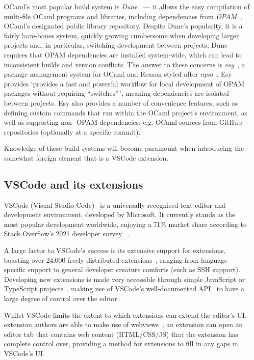 OCaml's most popular build system is \textit{Dune}~\cite{dune} --- it allows the
easy compilation of multi-file OCaml programs and libraries, including
dependencies from \textit{OPAM}~\cite{opam}, OCaml's designated public library
repository. Despite Dune's popularity, it is a fairly bare-bones system, quickly
growing cumbersome when developing larger projects and, in particular,
switching development between projects; Dune requires that OPAM dependencies
are installed system-wide, which can lead to inconsistent builds and version
conflicts. The answer to these concerns is \textit{esy}~\cite{esy}, a package
management system for OCaml and Reason styled after \textit{npm}~\cite{npm}.
Esy provides `provides a fast and powerful workflow for local development of
OPAM packages without requiring ``switches''\,', meaning dependencies are
isolated between projects. Esy also provides a number of convenience features,
such as defining custom commands that run within the OCaml project's
environment, as well as supporting non- OPAM dependencies, e.g. OCaml sources
from GitHub repositories (optionally at a specific commit).

Knowledge of these build systems will become paramount when introducing the
somewhat foreign element that is a VSCode extension.

\subsection{VSCode and its extensions}\label{sec:vscode}

VSCode (Visual Studio Code)~\cite{vscode} is a universally recognised text
editor and development environment, developed by Microsoft. It currently stands
as the most popular development worldwide, enjoying a 71\% market share
according to Stack Overflow's 2021 developer survey
~\cite{stack-overflow-survey-editors}.

A large factor to VSCode's success is its extensive support for extensions,
boasting over 24,000 freely-distributed extensions~\cite{vscode-features},
ranging from language-specific support to general developer creature comforts
(such as SSH support). Developing new extensions is made very accessible through
simple JavaScript or TypeScript projects~\cite{vscode-extensions-intro}, making
use of VSCode's well-documented API~\cite{vscode-api} to have a large degree of
control over the editor.

Whilst VSCode limits the extent to which extensions can extend the editor's UI,
extension authors are able to make use of webviews~\cite{vscode-webview}; an
extension can open an editor tab that contains web content (HTML/CSS/JS) that
the extension has complete control over, providing a method for extensions to
fill in any gaps in VSCode's UI.\@

